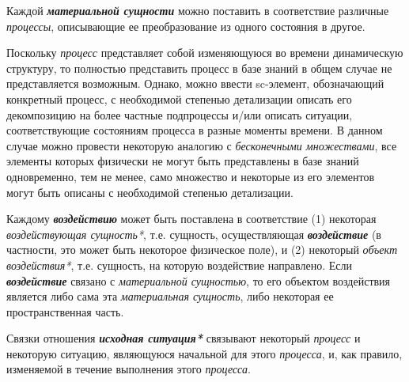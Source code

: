 \begin{SCn}
\begin{scnsubdividing}
\end{scnsubdividing}
\end{SCn}

Каждой \textbf{\textit{материальной сущности}} можно поставить в соответствие различные \textit{процессы}, описывающие ее преобразование из одного состояния в другое.

Поскольку \textit{процесс} представляет собой изменяющуюся во времени динамическую структуру, то полностью представить процесс в базе знаний в общем случае не представляется возможным. Однако, можно ввести sc-элемент, обозначающий конкретный процесс, с необходимой степенью детализации описать его декомпозицию на более частные подпроцессы и/или описать ситуации, соответствующие состояниям процесса в разные моменты времени. В данном случае можно провести некоторую аналогию с \textit{бесконечными множествами}, все элементы которых физически не могут быть представлены в базе знаний одновременно, тем не менее, само множество и некоторые из его элементов могут быть описаны с необходимой степенью детализации.
	
\begin{SCn}
\end{SCn}

Каждому \textbf{\textit{воздействию}} может быть поставлена в соответствие (1) некоторая \textit{воздействующая сущность*}, т.е. сущность, осуществляющая \textbf{\textit{воздействие}} (в частности, это может быть некоторое физическое поле), и (2) некоторый \textit{объект воздействия*}, т.е. сущность, на которую воздействие направлено. Если \textbf{\textit{воздействие}} связано с \textit{материальной сущностью}, то его объектом воздействия является либо сама эта \textit{материальная сущность}, либо некоторая ее пространственная часть.

\begin{SCn}
\end{SCn}

Связки отношения \textbf{\textit{исходная ситуация*}} связывают некоторый \textit{процесс} и некоторую ситуацию, являющуюся начальной для этого \textit{процесса}, и, как правило, изменяемой в течение выполнения этого \textit{процесса}.
			
